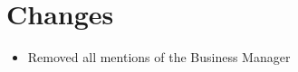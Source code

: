 \section{Changes}
\label{changes}
\begin{itemize}
\item Removed all mentions of the Business Manager
\end{itemize}
